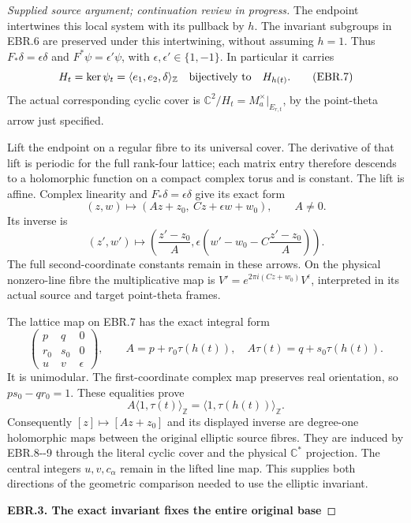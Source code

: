 \begin{proof}[Supplied source argument; continuation review in progress]
The endpoint intertwines this local system with its pullback by
\(h\). The invariant subgroups in EBR.6 are preserved under this
intertwining, without assuming \(h=1\). Thus
\(F_*\delta=\epsilon\delta\) and \(F^*\psi=\epsilon'\psi\),
with \(\epsilon,\epsilon'\in\{1,-1\}\). In particular it carries
\[
 H_t=\ker\psi_t=\langle e_1,e_2,\delta\rangle_{\mathbb Z}
 \quad\hbox{bijectively to}\quad H_{h(t)}.
 \tag{EBR.7}
\]
The actual corresponding cyclic cover is
\(\mathbb C^2/H_t=M_a^\times|_{E_{r,t}}\), by the point-theta
arrow just specified.

Lift the endpoint on a regular fibre to its universal cover.
The derivative of that lift is periodic for the full rank-four
lattice; each matrix entry therefore descends to a holomorphic
function on a compact complex torus and is constant. The lift is
affine. Complex linearity and \(F_*\delta=\epsilon\delta\)
give its exact form
\[
 (z,w)\longmapsto
 (A z+z_0,\ C z+\epsilon w+w_0),\qquad A\ne0.
 \tag{EBR.8}
\]
Its inverse is
\[
 (z',w')\longmapsto
 \left(\frac{z'-z_0}{A},
 \epsilon\left(w'-w_0-C\frac{z'-z_0}{A}\right)\right).
 \tag{EBR.9}
\]
The full second-coordinate constants remain in these arrows.
On the physical nonzero-line fibre the multiplicative map is
\(V'\!=e^{2\pi i(Cz+w_0)}V^\epsilon\), interpreted in its
actual source and target point-theta frames.

The lattice map on EBR.7 has the exact integral form
\[
 \begin{pmatrix}p&q&0\\ r_0&s_0&0\\ u&v&\epsilon\end{pmatrix},
 \qquad
 A=p+r_0\tau(h(t)),\quad
 A\tau(t)=q+s_0\tau(h(t)).
 \tag{EBR.10}
\]
It is unimodular. The first-coordinate complex map preserves real
orientation, so \(ps_0-qr_0=1\). These equalities prove
\[
 A\langle1,\tau(t)\rangle_{\mathbb Z}
 =\langle1,\tau(h(t))\rangle_{\mathbb Z}.
 \tag{EBR.11}
\]
Consequently \([z]\mapsto[Az+z_0]\) and its displayed inverse
are degree-one holomorphic maps between the original elliptic
source fibres. They are induced by EBR.8-\/-9 through the literal
cyclic cover and the physical \(\mathbb C^*\) projection.
The central integers \(u,v,c_\alpha\) remain in the lifted line
map. This supplies both directions of the geometric comparison
needed to use the elliptic invariant.

\par

\medskip\noindent\textbf{EBR.3. The exact invariant fixes the entire original base}


\end{proof}
